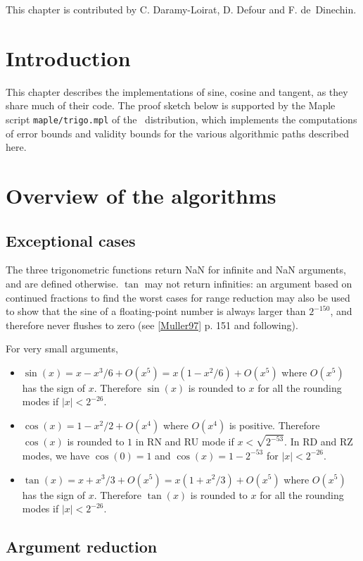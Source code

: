 This chapter is contributed by C. Daramy-Loirat, D. Defour
and F. de~Dinechin.  

\section*{Introduction}
This chapter describes the implementations of sine, cosine and
tangent, as they share much of their code. The proof sketch below is
supported by the Maple script \texttt{maple/trigo.mpl} of the \crlibm\
distribution, which implements the computations of error bounds and
validity bounds for the various algorithmic paths described here.

\section{Overview of the algorithms}

\subsection{Exceptional cases}

The three trigonometric functions return NaN for infinite and NaN
arguments, and are defined otherwise. $\tan$ may not return
infinities: an argument based on continued fractions to find the worst
cases for range reduction may also be used to show that the sine of a
floating-point number is always larger than $2^{-150}$, and therefore
never flushes to zero (see \ref{Muller97} p. 151 and following).

For very small arguments,
\begin{itemize}
\item $\sin(x) = x-x^3/6 + O(x^5) = x(1-x^2/6) + O(x^5)$ where
  $O(x^5)$ has the sign of $x$. Therefore $\sin(x)$ is rounded to $x$
  for all the rounding  modes if $|x|<2^{-26}$.
\item $\cos(x) = 1-x^2/2 + O(x^4)$ where $O(x^4)$ is positive.
  Therefore $\cos(x)$ is rounded to $1$ in RN and RU mode if
  $x<\sqrt{2^{-53}}$. In RD and RZ modes, we have $\cos(0)=1$ and
  $\cos(x)=1-2^{-53}$ for $|x|<2^{-26}$.
\item $\tan(x) = x+x^3/3 + O(x^5) = x(1+x^2/3) + O(x^5)$ where
  $O(x^5)$ has the sign of $x$. Therefore $\tan(x)$ is rounded to $x$
  for all the rounding  modes if $|x|<2^{-26}$.
\end{itemize}


\subsection{Argument reduction}

